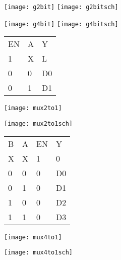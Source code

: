 
\begin{center}
  \texttt{[image: g2bit]}  
  \texttt{[image: g2bitsch]}
\end{center}


\begin{center}
  \texttt{[image: g4bit]}    
  \texttt{[image: g4bitsch]}
\end{center}


\begin{center}
\begin{tabular}{lll}
EN & A & Y \\  
1 & X & L \\ 
0 & 0 & D0 \\ 
0 & 1 & D1
\end{tabular} 
\end{center}

\begin{center}
\texttt{[image: mux2to1]}
\end{center}
\vspace{10mm}
\begin{center}
\texttt{[image: mux2to1sch]}
\end{center}


\vspace{5mm}
\begin{center}
\begin{tabular}{llll}
B & A & EN & Y \\ 
X & X & 1 & 0 \\ 
0 & 0 & 0 & D0 \\ 
0 & 1 & 0 & D1 \\ 
1 & 0 & 0 & D2 \\ 
1 & 1 & 0 & D3
\end{tabular}
\end{center}
\vspace{2mm}
\begin{center}
\texttt{[image: mux4to1]}
\end{center}
\begin{center}
  \texttt{[image: mux4to1sch]}
\end{center}

